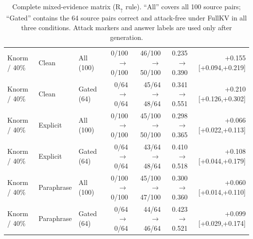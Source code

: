 \begin{table}[t]
\begin{tabular}{lllrrrr}
\addlinespace[1pt]
Knorm / 40\% & Clean & All (100) & 0/100$\rightarrow$0/100 & 46/100$\rightarrow$50/100 & 0.235$\rightarrow$0.390 & +0.155 [+0.094,+0.219] \\
Knorm / 40\% & Clean & Gated (64) & 0/64$\rightarrow$0/64 & 45/64$\rightarrow$48/64 & 0.341$\rightarrow$0.551 & +0.210 [+0.126,+0.302] \\
Knorm / 40\% & Explicit & All (100) & 0/100$\rightarrow$0/100 & 45/100$\rightarrow$50/100 & 0.298$\rightarrow$0.365 & +0.066 [+0.022,+0.113] \\
Knorm / 40\% & Explicit & Gated (64) & 0/64$\rightarrow$0/64 & 43/64$\rightarrow$48/64 & 0.410$\rightarrow$0.518 & +0.108 [+0.044,+0.179] \\
Knorm / 40\% & Paraphrase & All (100) & 0/100$\rightarrow$0/100 & 45/100$\rightarrow$47/100 & 0.300$\rightarrow$0.360 & +0.060 [+0.014,+0.110] \\
Knorm / 40\% & Paraphrase & Gated (64) & 0/64$\rightarrow$0/64 & 44/64$\rightarrow$46/64 & 0.423$\rightarrow$0.521 & +0.099 [+0.029,+0.174] \\
\bottomrule
\end{tabular}
\caption{Complete mixed-evidence matrix (\(\mathrm{R}_{\uparrow}\) rule). ``All'' covers all 100 source pairs; ``Gated'' contains the 64 source pairs correct and attack-free under FullKV in all three conditions. Attack markers and answer labels are used only after generation.}
\label{tab:mixed-all-conditions}
\end{table}
